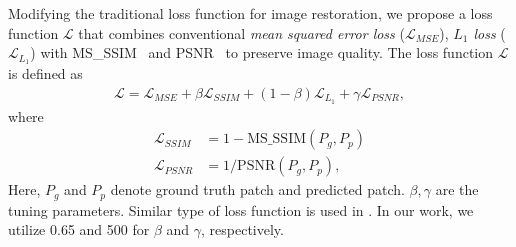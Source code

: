 Modifying the traditional loss function for image restoration, we propose a loss function $\mathcal{L}$ that combines conventional \emph{mean squared error loss} ($\mathcal{L}_{MSE}$), \emph{$L_1$ loss} ($\mathcal{L}_{L_1}$) with MS\_SSIM~\cite{ms_ssim} and PSNR~\cite{psnr} to preserve image quality. The loss function $\mathcal{L}$ is defined as   
\begin{align} \label{loss_func}
    \mathcal{L} = \mathcal{L}_{MSE} + \beta\mathcal{L}_{SSIM} + (1 - \beta)\mathcal{L}_{L_1} + \gamma\mathcal{L}_{PSNR},
\end{align}
where
\begin{align}
\mathcal{L}_{SSIM} &= 1-\mathrm{MS\_SSIM}( P_{g} ,P_{p}) \\
\mathcal{L}_{PSNR} &= 1/\mathrm{PSNR}( P_{g} ,P_{p}),
\end{align}
Here, $P_{g}$ and $P_{p}$ denote ground truth patch and predicted patch. $\beta, \gamma$ are the tuning parameters. Similar type of loss function is used in \cite{machinelearning_multi_refocus}. In our work, we utilize  0.65 and 500 for $\beta$ and $\gamma$, respectively.




